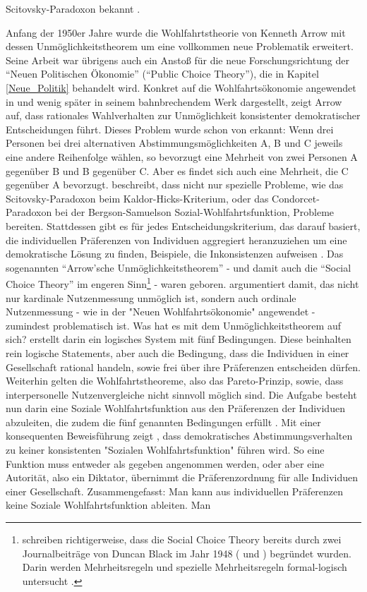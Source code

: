Scitovsky-Paradoxon bekannt \parencite[S. 12]{Suzumura2016}.

Anfang der 1950er Jahre wurde die Wohlfahrtstheorie von Kenneth Arrow mit dessen Unmöglichkeitstheorem um eine vollkommen neue Problematik erweitert. Seine Arbeit war übrigens auch ein Anstoß für die neue Forschungsrichtung der "`Neuen Politischen Ökonomie"' ("`Public Choice Theory"'), die in Kapitel \ref{Neue_Politik} behandelt wird. Konkret auf die Wohlfahrtsökonomie angewendet in \textcite[S. 329]{Arrow1950} und wenig später in seinem bahnbrechendem Werk \parencite{Arrow1951} dargestellt, zeigt Arrow auf, dass rationales Wahlverhalten zur Unmöglichkeit konsistenter demokratischer Entscheidungen führt. Dieses Problem wurde schon von \textcite{Condorcet1785} erkannt: Wenn drei Personen bei drei alternativen Abstimmungsmöglichkeiten A, B und C jeweils eine andere Reihenfolge wählen, so bevorzugt eine Mehrheit von zwei Personen A gegenüber B und B gegenüber C. Aber es findet sich auch eine Mehrheit, die C gegenüber A bevorzugt. \textcite{Arrow1950} beschreibt, dass nicht nur spezielle Probleme, wie das Scitovsky-Paradoxon beim Kaldor-Hicks-Kriterium, oder das Condorcet-Paradoxon bei der Bergson-Samuelson Sozial-Wohlfahrtsfunktion, Probleme bereiten. Stattdessen gibt es für jedes Entscheidungskriterium, das darauf basiert, die individuellen Präferenzen von Individuen aggregiert heranzuziehen um eine demokratische Lösung zu finden, Beispiele, die Inkonsistenzen aufweisen \parencite[S. 330]{Arrow1950}. Das sogenannten "`Arrow'sche Unmöglichkeitstheorem"' - und damit auch die "`Social Choice Theory"' im engeren Sinn\footnote{\textcite{Fleurbaey2021} schreiben richtigerweise, dass die Social Choice Theory bereits durch zwei Journalbeiträge von Duncan Black im Jahr 1948 (\textcite{Black1948a} und \textcite{Black1948b}) begründet wurden. Darin werden Mehrheitsregeln und spezielle Mehrheitsregeln formal-logisch untersucht \parencite{Fleurbaey2021}.} - waren geboren. \textcite{Arrow1950} argumentiert damit, das nicht nur kardinale Nutzenmessung unmöglich ist, sondern auch ordinale Nutzenmessung - wie in der "Neuen Wohlfahrtsökonomie" angewendet - zumindest problematisch ist. Was hat es mit dem Unmöglichkeitstheorem auf sich? \textcite{Arrow1950} erstellt darin ein logisches System mit fünf Bedingungen. Diese beinhalten rein logische Statements, aber auch die Bedingung, dass die Individuen in einer Gesellschaft rational handeln, sowie frei über ihre Präferenzen entscheiden dürfen. Weiterhin gelten die Wohlfahrtstheoreme, also das Pareto-Prinzip, sowie, dass  interpersonelle Nutzenvergleiche nicht sinnvoll möglich sind. Die Aufgabe besteht nun darin eine Soziale Wohlfahrtsfunktion aus den Präferenzen der Individuen abzuleiten, die zudem die fünf genannten Bedingungen erfüllt \parencite[S. 339]{Arrow1950}. Mit einer konsequenten Beweisführung zeigt \textcite[S. 339ff]{Arrow1950}, dass demokratisches Abstimmungsverhalten zu keiner konsistenten "Sozialen Wohlfahrtsfunktion" führen wird. So eine Funktion muss entweder als gegeben angenommen werden, oder aber eine Autorität, also ein Diktator, übernimmt die Präferenzordnung für alle Individuen einer Gesellschaft. Zusammengefasst: Man kann aus individuellen Präferenzen keine Soziale Wohlfahrtsfunktion ableiten. Man 
